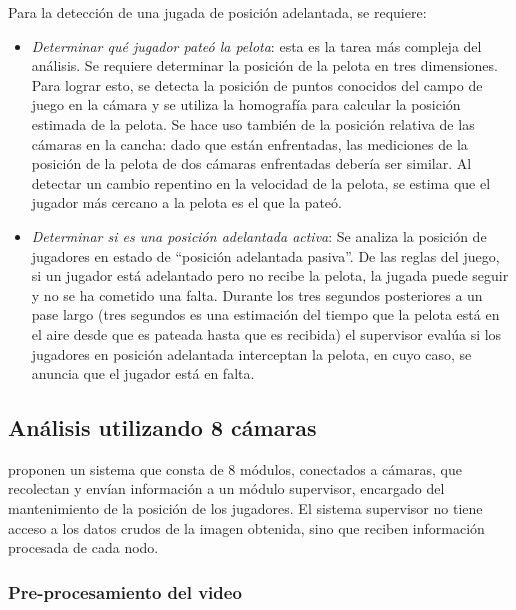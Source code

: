 Para la detección de una jugada de posición adelantada, se requiere:

\begin{itemize}

  \item \textit{Determinar qué jugador pateó la pelota}: esta es la tarea más
    compleja del análisis. Se requiere determinar la posición de la pelota en
    tres dimensiones. Para lograr esto, se detecta la posición de puntos
    conocidos del campo de juego en la cámara y se utiliza la homografía para
    calcular la posición estimada de la pelota. Se hace uso también de la
    posición relativa de las cámaras en la cancha: dado que están enfrentadas,
    las mediciones de la posición de la pelota de dos cámaras enfrentadas
    debería ser similar. Al detectar un cambio repentino en la velocidad de
    la pelota, se estima que el jugador más cercano a la pelota es el que
    la pateó.

  \item \textit{Determinar si es una posición adelantada activa}: Se analiza
    la posición de jugadores en estado de ``posición adelantada pasiva''. De
    las reglas del juego, si un jugador está adelantado pero no recibe la
    pelota, la jugada puede seguir y no se ha cometido una falta. Durante los
    tres segundos posteriores a un pase largo (tres segundos es una estimación
    del tiempo que la pelota está en el aire desde que es pateada hasta que es
    recibida) el supervisor evalúa si los jugadores en posición adelantada
    interceptan la pelota, en cuyo caso, se anuncia que el jugador está en
    falta.

\end{itemize}

\subsection{Análisis utilizando 8 cámaras}
\label{sec:8-camaras}

\citeauthor*{xu-8cams} proponen un sistema que consta de 8 módulos, conectados
a cámaras, que recolectan y envían información
a un módulo supervisor, encargado del mantenimiento de la posición de los
jugadores. El sistema supervisor no tiene acceso a los datos crudos de la
imagen obtenida, sino que reciben información procesada de cada nodo.

\subsubsection{Pre-procesamiento del video}

